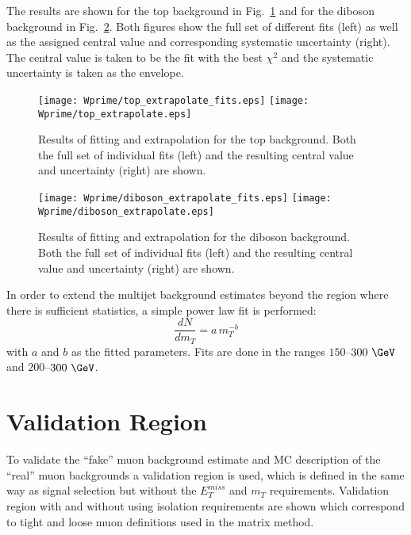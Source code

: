 The results are shown for the top background in
Fig.~\ref{fig:mu_extrapolate_top} and for the diboson background in Fig.~\ref{fig:mu_extrapolate_diboson}.
Both figures show the full set of different fits (left) as well as the assigned central value
and corresponding systematic uncertainty (right). The central value is taken to be the fit with the best $\chi^2$
and the systematic uncertainty is taken as the envelope.
\begin{figure}[!htb]
  \centering
  \texttt{[image: Wprime/top\_extrapolate\_fits.eps]}
  \texttt{[image: Wprime/top\_extrapolate.eps]}
  \caption{Results of fitting and extrapolation for the top background. Both the full set of individual
fits (left) and the resulting central value and uncertainty (right) are shown.}
  \label{fig:mu_extrapolate_top}
\end{figure}
\begin{figure}[!htb]
  \centering
  \texttt{[image: Wprime/diboson\_extrapolate\_fits.eps]}
  \texttt{[image: Wprime/diboson\_extrapolate.eps]}
  \caption{Results of fitting and extrapolation for the diboson background. Both the full set of individual
fits (left) and the resulting central value and uncertainty (right) are shown.}
  \label{fig:mu_extrapolate_diboson}
\end{figure}

In order to extend the multijet background estimates beyond the region where there is sufficient statistics, a simple power law fit is performed:
\begin{equation}
\frac{dN}{d m_T} = a\, m_T^{-b}
\end{equation}
with $a$ and $b$ as the fitted parameters. Fits are done in the ranges
$150$--$300~\GeV$ and $200$--$300~\GeV$.

\section{Validation Region}

To validate the ``fake'' muon background estimate and MC description of the ``real'' muon backgrounds
a validation region is used, which is defined in the same way as signal selection but without the $E_T^{miss}$ and $m_T$ requirements. Validation region with and without using isolation requirements
are shown which correspond to tight and loose muon definitions used in the matrix method.

